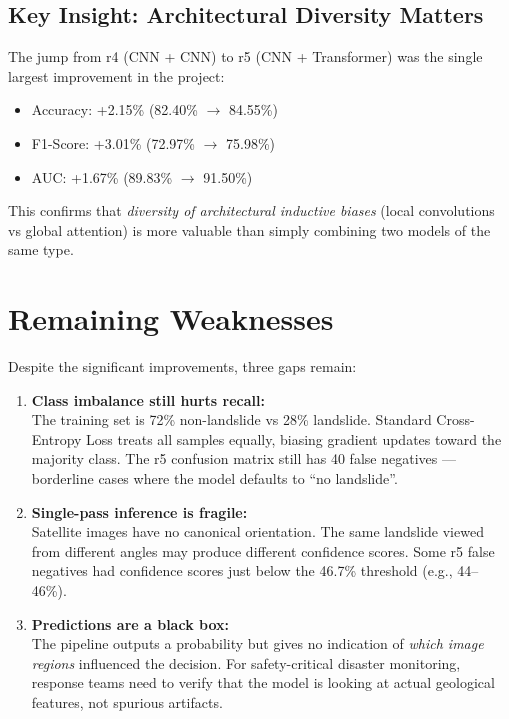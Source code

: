 \documentclass[11pt]{article}
\begin{document}
\subsection{Key Insight: Architectural Diversity Matters}

The jump from r4 (CNN + CNN) to r5 (CNN + Transformer) was the single largest improvement in the project:
\begin{itemize}[noitemsep]
    \item Accuracy: +2.15\% (82.40\% $\to$ 84.55\%)
    \item F1-Score: +3.01\% (72.97\% $\to$ 75.98\%)
    \item AUC: +1.67\% (89.83\% $\to$ 91.50\%)
\end{itemize}

This confirms that \textit{diversity of architectural inductive biases} (local convolutions vs global attention) is more valuable than simply combining two models of the same type.

\section{Remaining Weaknesses}

Despite the significant improvements, three gaps remain:

\begin{enumerate}
    \item \textbf{Class imbalance still hurts recall:}\\
          The training set is 72\% non-landslide vs 28\% landslide. Standard Cross-Entropy Loss treats all samples equally, biasing gradient updates toward the majority class. The r5 confusion matrix still has 40 false negatives --- borderline cases where the model defaults to ``no landslide''.

    \item \textbf{Single-pass inference is fragile:}\\
          Satellite images have no canonical orientation. The same landslide viewed from different angles may produce different confidence scores. Some r5 false negatives had confidence scores just below the 46.7\% threshold (e.g., 44--46\%).

    \item \textbf{Predictions are a black box:}\\
          The pipeline outputs a probability but gives no indication of \textit{which image regions} influenced the decision. For safety-critical disaster monitoring, response teams need to verify that the model is looking at actual geological features, not spurious artifacts.
\end{enumerate}
\end{document}
